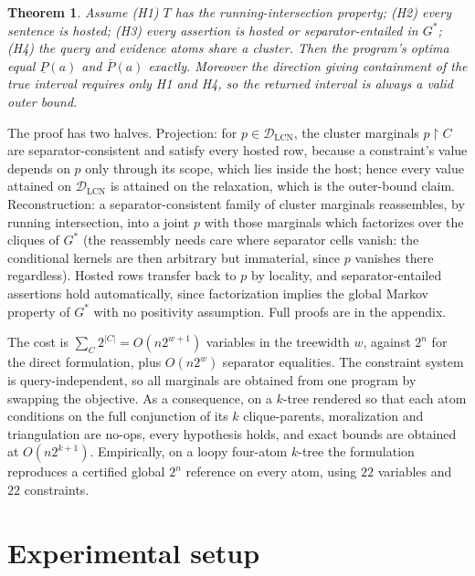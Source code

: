 \documentclass[11pt]{article}
\newtheorem{theorem}{Theorem}
\theoremstyle{definition}
\newcommand{\lo}{\underline}
\newcommand{\hi}{\overline}
\newcommand{\DLCN}{\mathcal{D}_{\mathrm{LCN}}}
\newcommand{\restr}{\!\restriction\!}
\begin{document}
\begin{theorem}\label{thm:paper}
Assume \textup{(H1)} $T$ has the running-intersection property; \textup{(H2)}
every sentence is hosted; \textup{(H3)} every assertion is hosted or
separator-entailed in $G^\ast$; \textup{(H4)} the query and evidence atoms share
a cluster. Then the program's optima equal $\lo P(a)$ and $\hi P(a)$ exactly.
Moreover the direction giving containment of the true interval requires only
\textup{H1} and \textup{H4}, so the returned interval is always a valid outer
bound.
\end{theorem}

The proof has two halves. Projection: for $p\in\DLCN$, the cluster marginals
$p\restr C$ are separator-consistent and satisfy every hosted row, because a
constraint's value depends on $p$ only through its scope, which lies inside the
host; hence every value attained on $\DLCN$ is attained on the relaxation, which
is the outer-bound claim. Reconstruction: a separator-consistent family of
cluster marginals reassembles, by running intersection, into a joint $p$ with
those marginals which factorizes over the cliques of $G^\ast$ (the reassembly
needs care where separator cells vanish: the conditional kernels are then
arbitrary but immaterial, since $p$ vanishes there regardless). Hosted rows
transfer back to $p$ by locality, and separator-entailed assertions hold
automatically, since factorization implies the global Markov property of
$G^\ast$ with no positivity assumption. Full proofs are in the appendix.

The cost is $\sum_C2^{|C|}=O(n2^{w+1})$ variables in the treewidth $w$, against
$2^n$ for the direct formulation, plus $O(n2^w)$ separator equalities. The
constraint system is query-independent, so all marginals are obtained from one
program by swapping the objective. As a consequence, on a $k$-tree rendered so
that each atom conditions on the full conjunction of its $k$ clique-parents,
moralization and triangulation are no-ops, every hypothesis holds, and exact
bounds are obtained at $O(n2^{k+1})$. Empirically, on a loopy four-atom $k$-tree
the formulation reproduces a certified global $2^n$ reference on every atom,
using $22$ variables and $22$ constraints.


\section{Experimental setup}\label{sec:repro}
\end{document}

